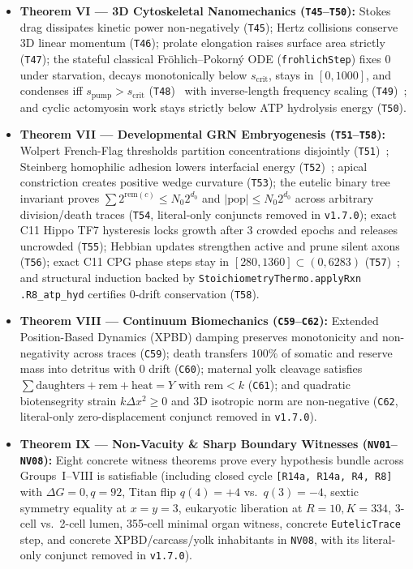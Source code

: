 \documentclass[11pt,reqno]{amsart}
\theoremstyle{plain}
\theoremstyle{definition}
\theoremstyle{remark}
\newcommand{\code}[1]{{\footnotesize\nolinkurl{#1}}}
\begin{document}
\begin{itemize}[leftmargin=1.6em, itemsep=2pt]
  \item \textbf{Theorem VI --- 3D Cytoskeletal Nanomechanics (\texttt{T45}--\texttt{T50}):} Stokes drag dissipates kinetic power non-negatively (\texttt{T45}); Hertz collisions conserve 3D linear momentum (\texttt{T46}); prolate elongation raises surface area strictly (\texttt{T47}); the stateful classical Fr\"ohlich--Pokorn\'y ODE (\code{frohlichStep}) fixes $0$ under starvation, decays monotonically below $s_{\mathrm{crit}}$, stays in $[0,1000]$, and condenses iff $s_{\mathrm{pump}} > s_{\mathrm{crit}}$ (\texttt{T48})~\cite{frohlich1968,pokorny2004} with inverse-length frequency scaling (\texttt{T49})~\cite{sahu2013}; and cyclic actomyosin work stays strictly below ATP hydrolysis energy (\texttt{T50}).
  \item \textbf{Theorem VII --- Developmental GRN Embryogenesis (\texttt{T51}--\texttt{T58}):} Wolpert French-Flag thresholds partition concentrations disjointly (\texttt{T51})~\cite{wolpert1969}; Steinberg homophilic adhesion lowers interfacial energy (\texttt{T52})~\cite{steinberg1963}; apical constriction creates positive wedge curvature (\texttt{T53}); the eutelic binary tree invariant proves $\sum 2^{\mathrm{rem}(c)} \le N_0 2^{d_0}$ and $|\mathrm{pop}| \le N_0 2^{d_0}$ across arbitrary division/death traces (\texttt{T54}, literal-only conjuncts removed in \texttt{v1.7.0}); exact C11 Hippo TF7 hysteresis locks growth after 3 crowded epochs and releases uncrowded (\texttt{T55}); Hebbian updates strengthen active and prune silent axons (\texttt{T56}); exact C11 CPG phase steps stay in $[280,1360] \subset (0, 6283)$ (\texttt{T57})~\cite{marder2001}; and structural induction backed by \code{StoichiometryThermo.applyRxn .R8_atp_hyd} certifies $0$-drift conservation (\texttt{T58}).
  \item \textbf{Theorem VIII --- Continuum Biomechanics (\texttt{C59}--\texttt{C62}):} Extended Position-Based Dynamics (XPBD) damping preserves monotonicity and non-negativity across traces (\texttt{C59}); death transfers $100\%$ of somatic and reserve mass into detritus with $0$ drift (\texttt{C60}); maternal yolk cleavage satisfies $\sum \mathrm{daughters} + \mathrm{rem} + \mathrm{heat} = Y$ with $\mathrm{rem} < k$ (\texttt{C61}); and quadratic biotensegrity strain $k\Delta x^2 \ge 0$ and 3D isotropic norm are non-negative (\texttt{C62}, literal-only zero-displacement conjunct removed in \texttt{v1.7.0}).
  \item \textbf{Theorem IX --- Non-Vacuity \& Sharp Boundary Witnesses (\texttt{NV01}--\texttt{NV08}):} Eight concrete witness theorems prove every hypothesis bundle across Groups~I--VIII is satisfiable (including closed cycle \code{[R14a, R14a, R4, R8]} with $\Delta G = 0, q = 92$, Titan flip $q(4)=+4$ vs.\ $q(3)=-4$, sextic symmetry equality at $x=y=3$, eukaryotic liberation at $R=10, K=334$, 3-cell vs.\ 2-cell lumen, 355-cell minimal organ witness, concrete \code{EutelicTrace} step, and concrete XPBD/carcass/yolk inhabitants in \texttt{NV08}, with its literal-only conjunct removed in \texttt{v1.7.0}).

\end{itemize}
\end{document}
